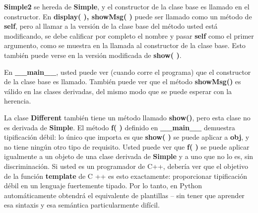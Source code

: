 \textbf{Simple2} se hereda de \textbf{Simple}, y el constructor de la clase base es llamado en el constructor. En \textbf{display( ), showMsg( )} puede ser llamado como un método de \textbf{self}, pero al llamar a la versión de la clase base del método usted está modificando, se debe calificar por completo el nombre y pasar \textbf{self} como el primer argumento, como se muestra en la llamada al constructor de la clase base. Esto también puede verse en la versión modificada de \textbf{show( )}. \newline

En \textbf{\_\_main\_\_}, usted puede ver (cuando corre el programa) que el constructor de la clase base es llamado. También puede ver que el método \textbf{showMsg()} es válido en las clases derivadas, del mismo modo que se puede esperar con la herencia.\newline

La clase \textbf{Different} también tiene un método llamado \textbf{show()}, pero esta clase no es derivada de \textbf{Simple}. El método \textbf{f( )} definido en \textbf{\_\_main\_\_} demuestra tipificación débil:  lo único que %
importa es que \textbf{show( )} se puede aplicar a \textbf{obj}, y no tiene ningún otro tipo de requisito. Usted puede ver que \textbf{f( )} se puede aplicar igualmente a un objeto de una clase derivada de \textbf{Simple} y a uno que no lo es, sin discriminación.
Si usted es un programador de C++, debería ver que el objetivo de la función \textbf{template} de C ++ es esto exactamente: proporcionar tipificación débil en un lenguaje fuertemente tipado. 
Por lo tanto, en Python automáticamente obtendrá el equivalente de plantillas –  sin tener que aprender esa sintaxis y esa semántica particularmente difícil.  

\newpage